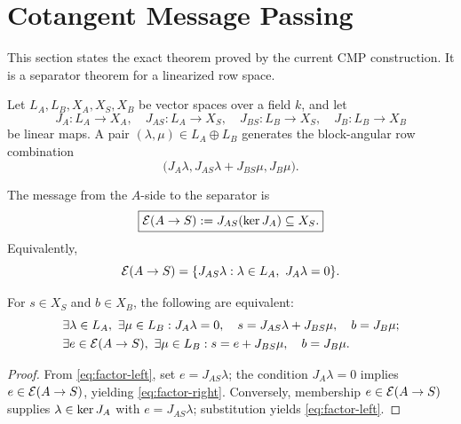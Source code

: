 \section{Cotangent Message Passing}
\label{sec:cmp}

This section states the exact theorem proved by the current CMP construction.
It is a separator theorem for a linearized row space.

Let \(L_A,L_B,X_A,X_S,X_B\) be vector spaces over a field \(k\), and let
\begin{equation}
  J_A:L_A\to X_A,\quad
  J_{AS}:L_A\to X_S,\quad
  J_{BS}:L_B\to X_S,\quad
  J_B:L_B\to X_B
\end{equation}
be linear maps.  A pair \((\lambda,\mu)\in L_A\oplus L_B\) generates the
block-angular row combination
\begin{equation}
  \bigl(J_A\lambda,
  J_{AS}\lambda+J_{BS}\mu,
  J_B\mu\bigr).
  \label{eq:block-row-combination}
\end{equation}

\begin{definition}
\label{def:intrinsic-message}
The message from the \(A\)-side to the separator is
\begin{equation}
  \boxed{
  \mathcal{E}(A\to S):=J_{AS}(\operatorname{ker} J_A)\subseteq X_S.}
  \label{eq:intrinsic-message}
\end{equation}
Equivalently,
\begin{equation}
  \mathcal{E}(A\to S)=
  \{J_{AS}\lambda:\lambda\in L_A,\ J_A\lambda=0\}.
\end{equation}
\end{definition}

\begin{theorem}
\label{thm:linear-separator-factorization}
For \(s\in X_S\) and \(b\in X_B\), the following are equivalent:
\begin{align}
 &\exists\lambda\in L_A,\ \exists\mu\in L_B:
 J_A\lambda=0,\quad
 s=J_{AS}\lambda+J_{BS}\mu,\quad b=J_B\mu;
 \label{eq:factor-left}\\
 &\exists e\in\mathcal{E}(A\to S),\ \exists\mu\in L_B:
 s=e+J_{BS}\mu,\quad b=J_B\mu.
 \label{eq:factor-right}
\end{align}
\end{theorem}

\begin{proof}
From \cref{eq:factor-left}, set \(e=J_{AS}\lambda\); the condition
\(J_A\lambda=0\) implies \(e\in\mathcal{E}(A\to S)\), yielding
\cref{eq:factor-right}.  Conversely, membership
\(e\in\mathcal{E}(A\to S)\) supplies \(\lambda\in\operatorname{ker} J_A\) with
\(e=J_{AS}\lambda\); substitution yields \cref{eq:factor-left}.
\end{proof}

